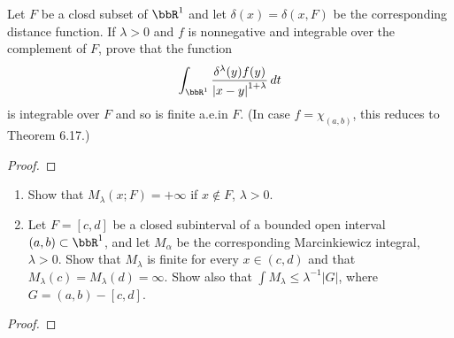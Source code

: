 \begin{problem}
Let $F$ be a closd subset of $\bbR^1$ and let $\delta(x)=\delta(x,F)$ be
the corresponding distance function. If $\lambda>0$ and $f$ is nonnegative
and integrable over the complement of $F$, prove that the function
\[
\int_{\bbR^1}\frac{\delta^\lambda(y)f(y)}{\left|x-y\right|^{1+\lambda}}\,dt
\]
is integrable over $F$ and so is finite a.e.\@ in $F$. (In case
$f=\chi_{(a,b)}$, this reduces to Theorem 6.17.)
\end{problem}
\begin{proof}
\end{proof}
\newpage

\begin{problem}
\begin{enumerate}[label=(\alph*)]
\item Show that $M_\lambda(x;F)=+\infty$ if $x\notin F$, $\lambda>0$.
\item Let $F=[c,d]$ be a closed subinterval of a bounded open interval
  $(a,b)\subset\bbR^1$, and let $M_\alpha$ be the corresponding
  Marcinkiewicz integral, $\lambda>0$. Show that $M_\lambda$ is finite for
  every $x\in(c,d)$ and that $M_\lambda(c)=M_\lambda(d)=\infty$. Show also
  that $\int M_\lambda\leq\lambda^{-1}|G|$, where $G=(a,b)-[c,d]$.
\end{enumerate}
\end{problem}
\begin{proof}
\end{proof}

